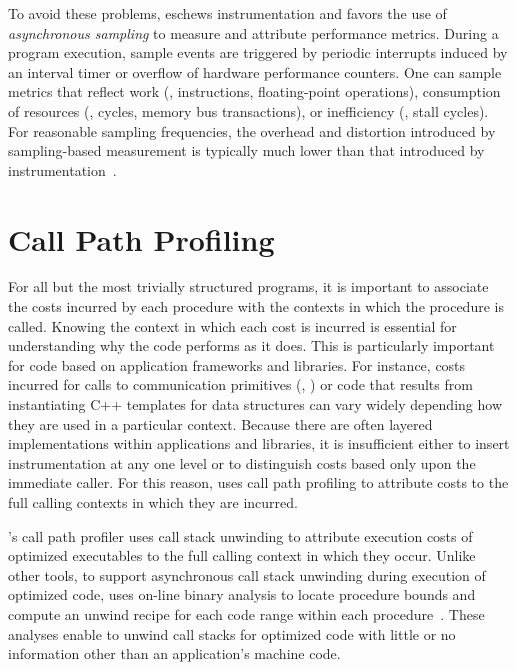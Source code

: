 \documentclass[11pt,letterpaper]{report}
\begin{document}
To avoid these problems, \HPCToolkit{} eschews instrumentation and favors the use of \emph{asynchronous sampling} to measure and attribute performance metrics.
During a program execution, sample events are triggered by periodic interrupts induced by an interval timer or overflow of hardware performance counters.
One can sample metrics that reflect work (\eg{}, instructions, floating-point operations), consumption of resources (\eg{}, cycles, memory bus transactions), or inefficiency (\eg{}, stall cycles).
For reasonable sampling frequencies, the overhead and distortion introduced by sampling-based measurement is typically much lower than that introduced by instrumentation~\cite{Froyd-MC-Fo:2005:ICS-csprof}.


\section{Call Path Profiling}

For all but the most trivially structured programs, it is important to associate the costs incurred by each procedure with the contexts in which the procedure is called.
Knowing the context in which each cost is incurred is essential for understanding why the code performs as it does.
This is particularly important for code based on application frameworks and libraries.
For instance, costs incurred for calls to communication primitives (\eg{}, ) or code that results from instantiating C++ templates for data structures can vary widely depending how they are used in a particular context.
Because there are often layered implementations within applications and libraries, it is insufficient either to insert instrumentation at any one level or to distinguish costs based only upon the immediate caller.
For this reason, \HPCToolkit{} uses call path profiling to attribute costs to the full calling contexts in which they are incurred.

\HPCToolkit{}'s \hpcrun{} call path profiler uses call stack unwinding to attribute execution costs of optimized executables to the full calling context in which they occur.
Unlike other tools, to support asynchronous call stack unwinding during execution of optimized code, \hpcrun{} uses on-line binary analysis to locate procedure bounds and compute an unwind recipe for each code range within each procedure~\cite{Tallent-MC-Fagan:2009:PLDI-hpctoolkit-binary-analysis}.
These analyses enable \hpcrun{} to unwind call stacks for optimized code with little or no information other than an application's machine code. 
\end{document}
